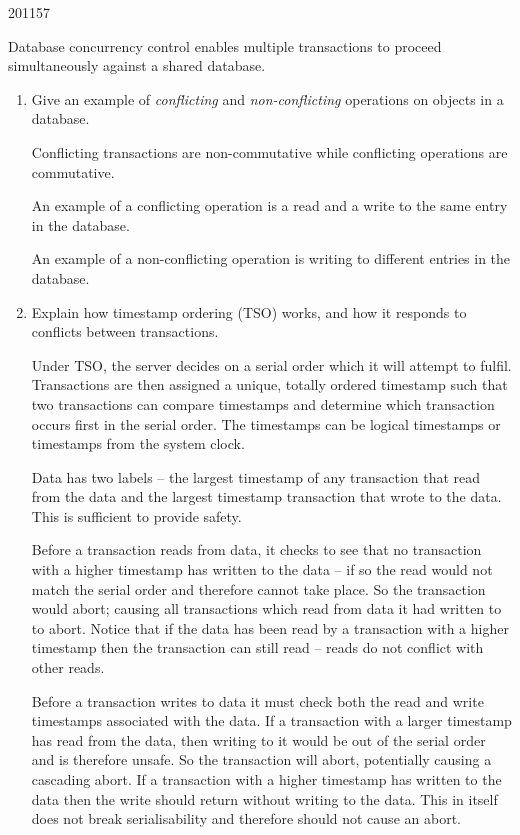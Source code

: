 \documentclass[10pt,\jkfside,a4paper]{article}
\begin{document}
\begin{examquestion}{2011}{5}{7}

Database concurrency control enables multiple transactions to proceed
simultaneously against a shared database.

\begin{enumerate}[label=(\alph*)]

\item Give an example of \textit{conflicting} and \textit{non-conflicting}
operations on objects in a database.

Conflicting transactions are non-commutative while conflicting operations
are commutative.

An example of a conflicting operation is a read and a write to the same
entry in the database.

An example of a non-conflicting operation is writing to different entries in
the database.

\item Explain how timestamp ordering (TSO) works, and how it responds to
conflicts between transactions.

Under TSO, the server decides on a serial order which it will attempt to
fulfil. Transactions are then assigned a unique, totally ordered timestamp
such that two transactions can compare timestamps and determine which
transaction occurs first in the serial order. The timestamps can be
logical timestamps or timestamps from the system clock.

Data has two labels -- the largest timestamp of any transaction that read
from the data and the largest timestamp transaction that wrote to the data.
This is sufficient to provide safety.

Before a transaction reads from data, it checks to see that no transaction
with a higher timestamp has written to the data -- if so the read would not
match the serial order and therefore cannot take place. So the transaction
would abort; causing all transactions which read from data it had written
to to abort. Notice that if the data has been read by a transaction with a
higher timestamp then the transaction can still read -- reads do not
conflict with other reads.

Before a transaction writes to data it must check both the read and write
timestamps associated with the data. If a transaction with a larger
timestamp has read from the data, then writing to it would be out of the
serial order and is therefore unsafe. So the transaction will abort,
potentially causing a cascading abort. If a transaction with a higher
timestamp has written to the data then the write should return without
writing to the data. This in itself does not break serialisability and
therefore should not cause an abort.


\end{enumerate}
\end{examquestion}
\end{document}
